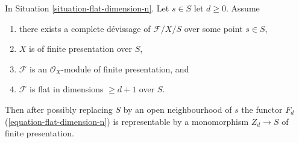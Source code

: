 \begin{lemma}
\label{lemma-flat-dimension-n-representable}
In Situation \ref{situation-flat-dimension-n}.
Let $s \in S$ let $d \geq 0$. Assume
\begin{enumerate}
\item there exists a complete d\'evissage
of $\mathcal{F}/X/S$ over some point $s \in S$,
\item $X$ is of finite presentation over $S$,
\item $\mathcal{F}$ is an $\mathcal{O}_X$-module of finite presentation, and
\item $\mathcal{F}$ is flat in dimensions $\geq d + 1$ over $S$.
\end{enumerate}
Then after possibly replacing $S$ by an open neighbourhood
of $s$ the functor $F_d$ (\ref{equation-flat-dimension-n})
is representable by a monomorphism $Z_d \to S$ of finite presentation.
\end{lemma}

